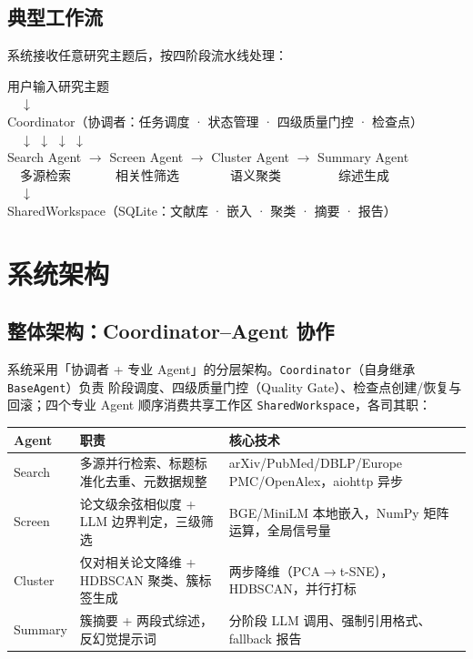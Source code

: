 \documentclass[10pt,a4paper]{article}
\begin{document}
\subsection{典型工作流}
系统接收任意研究主题后，按四阶段流水线处理：
\begin{center}
\begin{tcolorbox}[colback=gray!6,colframe=gray!50,boxrule=0.3pt,arc=2pt]
\small\ttfamily
用户输入研究主题\\
\ \ $\downarrow$\\
Coordinator（协调者：任务调度 · 状态管理 · 四级质量门控 · 检查点）\\
\ \ $\downarrow$ \hspace{6em} $\downarrow$ \hspace{5em} $\downarrow$ \hspace{5em} $\downarrow$\\
Search Agent $\rightarrow$ Screen Agent $\rightarrow$ Cluster Agent $\rightarrow$ Summary Agent\\
\ \ 多源检索\ \ \ \ \ \ \ 相关性筛选\ \ \ \ \ \ \ \ 语义聚类\ \ \ \ \ \ \ \ \ 综述生成\\
\ \ $\downarrow$\\
SharedWorkspace（SQLite：文献库 · 嵌入 · 聚类 · 摘要 · 报告）
\end{tcolorbox}
\end{center}

\section{系统架构}

\subsection{整体架构：Coordinator–Agent 协作}
系统采用「协调者 + 专业 Agent」的分层架构。\texttt{Coordinator}（自身继承 \texttt{BaseAgent}）负责
阶段调度、四级质量门控（Quality Gate）、检查点创建/恢复与回滚；四个专业 Agent 顺序消费共享工作区
\texttt{SharedWorkspace}，各司其职：

\begin{center}\small
\begin{tabularx}{\linewidth}{lYY}
\toprule
\textbf{Agent} & \textbf{职责} & \textbf{核心技术} \\
\midrule
Search  & 多源并行检索、标题标准化去重、元数据规整 & arXiv/PubMed/DBLP/Europe PMC/OpenAlex，aiohttp 异步 \\
Screen  & 论文级余弦相似度 + LLM 边界判定，三级筛选 & BGE/MiniLM 本地嵌入，NumPy 矩阵运算，全局信号量 \\
Cluster & 仅对相关论文降维 + HDBSCAN 聚类、簇标签生成 & 两步降维（PCA$\rightarrow$t-SNE），HDBSCAN，并行打标 \\
Summary & 簇摘要 + 两段式综述，反幻觉提示词 & 分阶段 LLM 调用、强制引用格式、fallback 报告 \\
\bottomrule
\end{tabularx}
\end{center}
\end{document}
